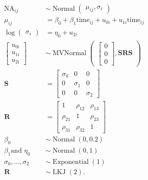 \documentclass[]{article}
\begin{document}
\[
\begin{align*}
\text{NA}_{ij} & \sim \operatorname{Normal}\begin{pmatrix} \mu_{ij}, \sigma_{i} \end{pmatrix} \\
\mu_{ij} & = \beta_0 + \beta_1 \text{time}_{ij} + u_{0i} + u_{1i} \text{time}_{ij} \\ 
\log \begin{pmatrix} \sigma_i \end{pmatrix} & = \eta_0 + u_{2i} \\
\begin{bmatrix} u_{0i} \\ u_{1i} \\ u_{2i} \end{bmatrix} & \sim \operatorname{MVNormal}\begin{pmatrix} \begin{bmatrix} 0 \\ 0 \\ 0 \end{bmatrix}, \mathbf S \mathbf R \mathbf S \end{pmatrix} \\
\mathbf S & = \begin{bmatrix} \sigma_0 & 0 & 0 \\ 0 & \sigma_1 & 0 \\ 0 & 0 & \sigma_2 \end{bmatrix} \\
\mathbf R & = \begin{bmatrix} 1 & \rho_{12} & \rho_{13} \\ \rho_{21} & 1 & \rho_{23} \\ \rho_{31} & \rho_{32} & 1 \end{bmatrix} \\
\beta_0   & \sim \operatorname{Normal}(0, 0.2) \\
\beta_1 \text{and } \eta_0 & \sim \operatorname{Normal}(0, 1) \\
\sigma_0,..., \sigma_2     & \sim \operatorname{Exponential}(1) \\
\mathbf R & \sim \operatorname{LKJ}(2).
\end{align*}
\]
\end{document}
